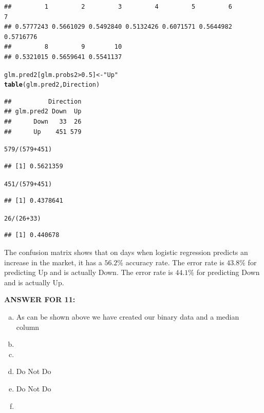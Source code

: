 \documentclass{article}\usepackage[]{graphicx}\usepackage[]{color}
\makeatletter
\newcommand{\hlnum}[1]{\textcolor[rgb]{0.686,0.059,0.569}{#1}}%
\newcommand{\hlstr}[1]{\textcolor[rgb]{0.192,0.494,0.8}{#1}}%
\newcommand{\hlopt}[1]{\textcolor[rgb]{0,0,0}{#1}}%
\newcommand{\hlstd}[1]{\textcolor[rgb]{0.345,0.345,0.345}{#1}}%
\newcommand{\hlkwb}[1]{\textcolor[rgb]{0.69,0.353,0.396}{#1}}%
\newcommand{\hlkwd}[1]{\textcolor[rgb]{0.737,0.353,0.396}{\textbf{#1}}}%
\newenvironment{kframe}{%
 \def\at@end@of@kframe{}%
 \ifinner\ifhmode%
  \def\at@end@of@kframe{\end{minipage}}%
  \begin{minipage}{\columnwidth}%
 \fi\fi%
 \def\FrameCommand##1{\hskip\@totalleftmargin \hskip-\fboxsep
 \colorbox{shadecolor}{##1}\hskip-\fboxsep
     \hskip-\linewidth \hskip-\@totalleftmargin \hskip\columnwidth}%
 \MakeFramed {\advance\hsize-\width
   \@totalleftmargin\z@ \linewidth\hsize
   \@setminipage}}%
 {\par\unskip\endMakeFramed%
 \at@end@of@kframe}
\newenvironment{knitrout}{}{} %
\makeatother
\begin{document}
\begin{enumerate}[(a)]
\begin{knitrout}
\begin{kframe}
\begin{verbatim}
##         1         2         3         4         5         6         7 
## 0.5777243 0.5661029 0.5492840 0.5132426 0.6071571 0.5644982 0.5716776 
##         8         9        10 
## 0.5321015 0.5659641 0.5541137
\end{verbatim}
\begin{alltt}
\hlstd{glm.pred2[glm.probs2}\hlopt{>}\hlnum{0.5}\hlstd{]}\hlkwb{<-}\hlstr{"Up"}
\hlkwd{table}\hlstd{(glm.pred2,Direction)}
\end{alltt}
\begin{verbatim}
##          Direction
## glm.pred2 Down  Up
##      Down   33  26
##      Up    451 579
\end{verbatim}
\begin{alltt}
\hlnum{579}\hlopt{/}\hlstd{(}\hlnum{579}\hlopt{+}\hlnum{451}\hlstd{)}
\end{alltt}
\begin{verbatim}
## [1] 0.5621359
\end{verbatim}
\begin{alltt}
\hlnum{451}\hlopt{/}\hlstd{(}\hlnum{579}\hlopt{+}\hlnum{451}\hlstd{)}
\end{alltt}
\begin{verbatim}
## [1] 0.4378641
\end{verbatim}
\begin{alltt}
\hlnum{26}\hlopt{/}\hlstd{(}\hlnum{26}\hlopt{+}\hlnum{33}\hlstd{)}
\end{alltt}
\begin{verbatim}
## [1] 0.440678
\end{verbatim}
\end{kframe}
\end{knitrout}

The confusion matrix shows that on days when logistic regression predicts an increase in the market, it has a $56.2\%$ accuracy rate. The error rate is $43.8\%$ for predicting Up and is actually Down. The error rate is $44.1\%$ for predicting Down and is actually Up.
\end{enumerate}

\textbf{ANSWER FOR 11:} \\

\begin{enumerate}[(a)]

\item

As can be shown above we have created our binary data and a median column

\item

\item

\item
Do Not Do
\item
Do Not Do
\item

\end{enumerate}
\end{document}
